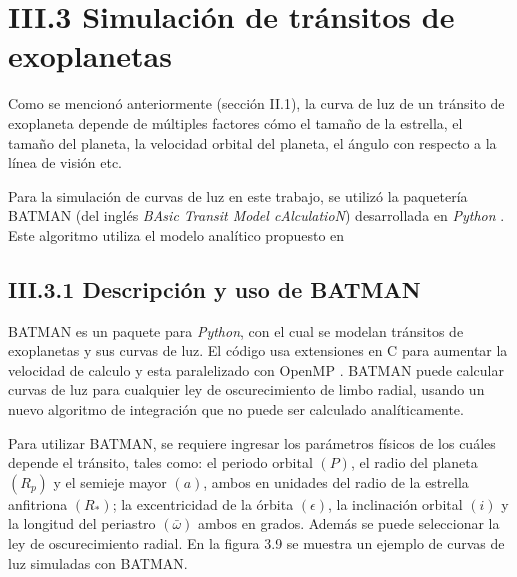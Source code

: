 \section*{III.3 Simulación de tránsitos de exoplanetas}


Como se mencionó anteriormente (sección II.1), la curva de luz de un tránsito de exoplaneta depende de múltiples factores cómo el tamaño de la estrella, el tamaño del planeta, la velocidad orbital del planeta, el ángulo con respecto a la línea de visión etc.

Para la simulación de curvas de luz en este trabajo, se utilizó la paquetería BATMAN (del inglés \textit{BAsic Transit Model cAlculatioN}) desarrollada en \textit{Python} \cite{kreidberg2015batman}. Este algoritmo utiliza el modelo analítico propuesto en \cite{mandel2002analytic}


\subsection*{III.3.1 Descripción y uso de BATMAN}

BATMAN es un paquete para \textit{Python}, con el cual se modelan tránsitos de exoplanetas y sus curvas de luz. El código usa extensiones en C para aumentar la velocidad de calculo y esta paralelizado con OpenMP \cite{kreidberg2015batman}. BATMAN puede calcular curvas de luz para cualquier ley de oscurecimiento de limbo radial, usando un nuevo algoritmo de integración que no puede ser calculado analíticamente.

Para utilizar BATMAN, se requiere ingresar los parámetros físicos de los cuáles depende el tránsito, tales como: el periodo orbital $(P)$, el radio del planeta $(R_{p})$ y el semieje mayor $(a)$, ambos en unidades del radio de la estrella anfitriona $(R_{*})$;  la excentricidad de la órbita $(\epsilon)$, la inclinación orbital $(i)$ y la longitud del periastro $(\bar{\omega})$ ambos en grados. Además se puede seleccionar la ley de oscurecimiento radial. En la figura 3.9 se muestra un ejemplo de curvas de luz simuladas con BATMAN. 

